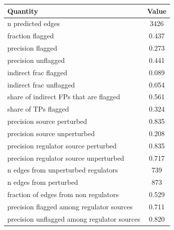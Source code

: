 \begin{tabular}{lc}
\toprule
Quantity & Value \\
\midrule
n predicted edges & 3426 \\
fraction flagged & 0.437 \\
precision flagged & 0.273 \\
precision unflagged & 0.441 \\
indirect frac flagged & 0.089 \\
indirect frac unflagged & 0.054 \\
share of indirect FPs that are flagged & 0.561 \\
share of TPs flagged & 0.324 \\
precision source perturbed & 0.835 \\
precision source unperturbed & 0.208 \\
precision regulator source perturbed & 0.835 \\
precision regulator source unperturbed & 0.717 \\
n edges from unperturbed regulators & 739 \\
n edges from perturbed & 873 \\
fraction of edges from non regulators & 0.529 \\
precision flagged among regulator sources & 0.711 \\
precision unflagged among regulator sources & 0.820 \\
\bottomrule
\end{tabular}
